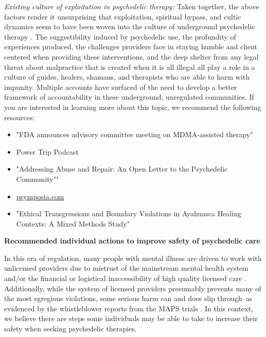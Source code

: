 \documentclass[12pt,letterpaper]{book}
\begin{document}
\textit{Existing culture of exploitation in psychedelic therapy:}
Taken together, the above factors render it unsurprising that exploitation, spiritual bypass, and cultic dynamics seem to have been woven into the culture of underground psychedelic therapy \cite{powerTrip,devenotCommittee,abuseLetter,brown2020ethical}. The suggestibility induced by psychedelic use, the profundity of experiences produced, the challenges providers face in staying humble and client centered when providing these interventions, and the deep shelter from any legal threat about malpractice that is created when it is all illegal all play a role in a culture of guides, healers, shamans, and therapists who are able to harm with impunity. Multiple accounts have surfaced of the need to develop a better framework of accountability in these underground, unregulated communities.
If you are interested in learning more about this topic, we recommend the following resources:
\begin{itemize}
    \item "FDA announces advisory committee meeting on MDMA-assisted therapy" \cite{devenotCommittee}
    \item Power Trip Podcast \cite{powerTrip}
    \item "Addressing Abuse and Repair: An Open Letter to the Psychedelic Community"" \cite{abuseLetter}
    \item \href{psymposia.com}{psymposia.com}
    \item "Ethical Transgressions and Boundary Violations in Ayahuasca Healing Contexts: A Mixed Methods Study" \cite{brown2020ethical}
\end{itemize}

\noindent \textbf{Recommended individual actions to improve safety of psychedelic care}
\label{sec:safetyActions}

In this era of regulation, many people with mental illness are driven to work with unlicensed providers due to mistrust of the mainstream mental health system and/or the financial or logistical inaccessibility of high quality licensed care \cite{aboujaoude2020coachingVSTherapy}. Additionally, while the system of licensed providers presumably prevents many of the most egregious violations, some serious harm can and does slip through--as evidenced by the whistleblower reports from the MAPS trials \cite{devenotCommittee}. In this context, we believe there are steps some individuals may be able to take to increase their safety when seeking psychedelic therapies.
\end{document}
